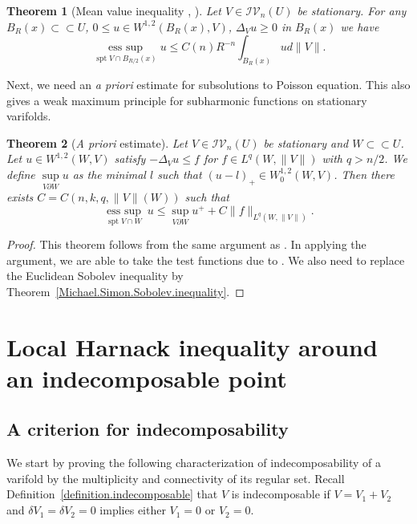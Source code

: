 \documentclass[11pt]{amsart}
\newtheorem{theorem}{Theorem}[section]
\theoremstyle{definition}
\newcommand{\IV}{\mathcal{IV}}
\newcommand{\ssubset}{\subset\subset}
\DeclareMathOperator{\spt}{spt}
\DeclareMathOperator{\esssup}{ess\ sup}
\begin{document}
\begin{theorem}[Mean value inequality {\cite[7.5 (6)]{allard1972first}, \cite[Theorem 3.4]{MS}}]\label{mean.value.inequality}
	Let $V\in \IV_n(U)$ be stationary. For any $B_R(x)\ssubset U$, $0\le u\in W^{1,2}(B_R(x),V)$, $\Delta_Vu\ge 0$ in $B_R(x)$ we have
	\[\underset{\spt V\cap B_{R/2}(x)}{\esssup} u\le C(n) R^{-n}\int_{B_R(x)}ud\|V\|.\]
\end{theorem}
Next, we need an \textit{a priori} estimate for subsolutions to Poisson equation. This also gives a weak maximum principle for subharmonic functions on stationary varifolds.

\begin{theorem}[\textit{A priori} estimate]\label{apri}Let $V\in \IV_n(U)$ be stationary and $W\ssubset U$. Let $u\in W^{1,2}(W,V)$ satisfy $-\Delta_V u\le f$ for $f\in L^{q}(W,\|V\|)$ with $q>n/2$. We define $\sup\limits_{V\partial W}u$ as the minimal $l$ such that $(u-l)_+\in W^{1,2}_0(W,V)$. Then there exists $C=C(n,k,q,\|V\|(W))$ such that 
	\[\underset{\spt V\cap W}{\esssup}\ u\le \sup_{V\partial W}u^++C\|f\|_{L^{q}(W,\|V\|)}.\]
\end{theorem}
\begin{proof}
	This theorem follows from the same argument as \cite[Theorem 8.15 and 8.16]{GT}. In applying the argument, we are able to take the test functions due to \cite[Remark 5.6]{Me1sobolev}. We also need to replace the Euclidean Sobolev inequality by Theorem~\ref{Michael.Simon.Sobolev.inequality}.
\end{proof}


\section{Local Harnack inequality around an indecomposable point}
\label{section.local.harnack.indecomposable}
\subsection{A criterion for indecomposability}
We start by proving the following characterization of indecomposability of a varifold by the multiplicity and connectivity of its regular set. Recall Definition~\ref{definition.indecomposable} that $V$ is indecomposable if $V=V_1+V_2$ and $\delta V_1=\delta V_2=0$ implies either $V_1=0$ or $V_2=0$.
 
\end{document}
